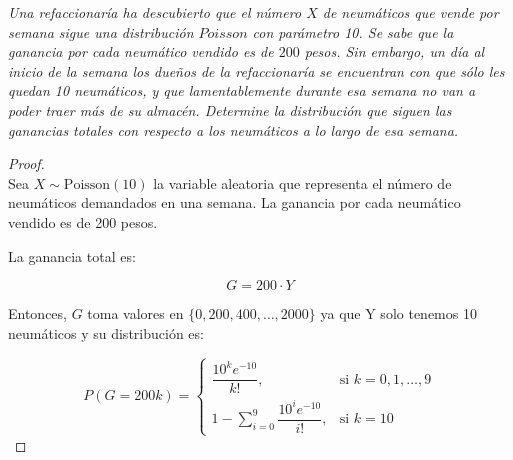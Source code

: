 \documentclass[11pt,letterpaper]{article}
\begin{document}
\newpage
\begin{tcolorbox}[ 
	title = \textcolor{black}{\textcolor{white}{Problema 6}},]
\textit{Una refaccionar\'ia ha descubierto que el n\'umero $X$ de neum\'aticos que vende por semana sigue una distribuci\'on $Poisson$ con par\'ametro 10. Se sabe que la ganancia por cada neum\'atico vendido es de $200$ pesos. Sin embargo, un d\'ia al inicio de la semana los due\~nos de la refaccionar\'ia se encuentran con que s\'olo les quedan 10 neum\'aticos, y que lamentablemente durante esa semana no van a poder traer m\'as de su almac\'en. Determine la distribuci\'on que siguen las ganancias totales con respecto a los neum\'aticos a lo largo de esa semana.
}
\end{tcolorbox}
\begin{proof}\,\\

    Sea \( X \sim \text{Poisson}(10) \) la variable aleatoria que representa el número de neumáticos demandados en una semana. La ganancia por cada neumático vendido es de 200 pesos.

La ganancia total es:

\[
G = 200 \cdot Y
\]

Entonces, \( G \) toma valores en \( \{0, 200, 400, \dots, 2000\} \) ya que Y solo tenemos 10 neumáticos y su distribución es:

\[
P(G = 200k) =
\begin{cases}
\dfrac{10^k e^{-10}}{k!}, & \text{si } k = 0, 1, \dots, 9 \\
1 - \sum_{i=0}^{9} \dfrac{10^i e^{-10}}{i!}, & \text{si } k = 10
\end{cases}
\]
\end{proof}\,\\
\end{document}
